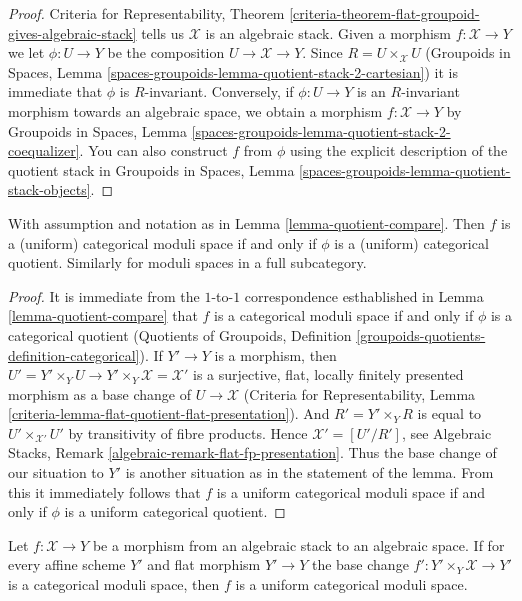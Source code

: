 \begin{proof}
Criteria for Representability, Theorem
\ref{criteria-theorem-flat-groupoid-gives-algebraic-stack}
tells us $\mathcal{X}$ is an algebraic stack.
Given a morphism $f : \mathcal{X} \to Y$ we let $\phi : U \to Y$ be
the composition $U \to \mathcal{X} \to Y$. Since $R = U \times_\mathcal{X} U$
(Groupoids in Spaces, Lemma
\ref{spaces-groupoids-lemma-quotient-stack-2-cartesian})
it is immediate that $\phi$ is $R$-invariant.
Conversely, if $\phi : U \to Y$ is an $R$-invariant morphism towards
an algebraic space, we obtain a morphism
$f : \mathcal{X} \to Y$ by
Groupoids in Spaces, Lemma
\ref{spaces-groupoids-lemma-quotient-stack-2-coequalizer}.
You can also construct $f$ from $\phi$ using the explicit description of
the quotient stack in
Groupoids in Spaces, Lemma
\ref{spaces-groupoids-lemma-quotient-stack-objects}.
\end{proof}

\begin{lemma}
\label{lemma-categorical-quotient-compare}
With assumption and notation as in Lemma \ref{lemma-quotient-compare}.
Then $f$ is a (uniform) categorical moduli space
if and only if $\phi$ is a (uniform) categorical quotient.
Similarly for moduli spaces in a full subcategory.
\end{lemma}

\begin{proof}
It is immediate from the $1$-to-$1$ correspondence esthablished in
Lemma \ref{lemma-quotient-compare} that $f$ is a categorical moduli space
if and only if $\phi$ is a categorical quotient
(Quotients of Groupoids, Definition
\ref{groupoids-quotients-definition-categorical}).
If $Y' \to Y$ is a morphism, then
$U' = Y' \times_Y U \to Y' \times_Y \mathcal{X} = \mathcal{X}'$
is a surjective, flat, locally finitely presented morphism
as a base change of $U \to \mathcal{X}$
(Criteria for Representability, Lemma
\ref{criteria-lemma-flat-quotient-flat-presentation}).
And $R' = Y' \times_Y R$ is equal to $U' \times_{\mathcal{X}'} U'$
by transitivity of fibre products.
Hence $\mathcal{X}' = [U'/R']$, see
Algebraic Stacks, Remark \ref{algebraic-remark-flat-fp-presentation}.
Thus the base change of our situation to $Y'$ is another situation
as in the statement of the lemma. From this it immediately
follows that $f$ is a uniform categorical moduli space
if and only if $\phi$ is a uniform categorical quotient.
\end{proof}

\begin{lemma}
\label{lemma-check-uniform-categorical-quotient-on-affines}
Let $f : \mathcal{X} \to Y$ be a morphism from an algebraic stack
to an algebraic space. If for every affine scheme $Y'$ and flat
morphism $Y' \to Y$ the base change
$f' : Y' \times_Y \mathcal{X} \to Y'$ is a categorical moduli space,
then $f$ is a uniform categorical moduli space.
\end{lemma}

